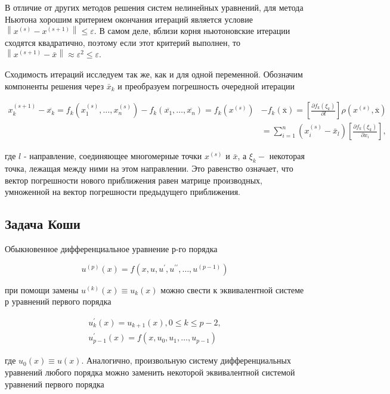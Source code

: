 \documentclass[a4paper,12pt]{article}
\begin{document}
В отличие от других методов решения систем нелинейных уравнений, для метода Ньютона хорошим критерием окончания итераций является условие $\left\|x^{(s)}-x^{(s+1)}\right\| \leq \varepsilon .$ В самом деле, вблизи корня ньютоновские итерации сходятся квадратично, поэтому если этот критерий выполнен, то $\left\|x^{(s+1)}-\bar{x}\right\| \approx \varepsilon^{2} \leq \varepsilon$.

Сходимость итераций исследуем так же, как и для одной переменной. Обозначим компоненты решения через $\bar{x}_{k}$ и преобразуем погрешность очередной итерации 

$$
\begin{aligned}
	x_{k}^{(s+1)}-\overline{x_{k}}=f_{k}\left(x_{1}^{(s)}, \ldots, x_{n}^{(s)}\right)-f_{k}\left(\overline{x_{1}}, \ldots, \overline{x_{n}}\right)=f_{k}\left(x^{(s)}\right)&-f_{k}(\overline{\mathrm{x}}) =\left[\frac{\partial f_{k}\left(\xi_{k}\right)}{\partial l}\right] \rho\left(x^{(s)}, \overline{\mathrm{x}}\right) \\
	&=\sum_{i=1}^{n}\left(x_{i}^{(s)}-\bar{x}_{l}\right)\left[\frac{\partial f_{k}\left(\xi_{k}\right)}{\partial x_{i}}\right],
\end{aligned}
$$

где $l$ - направление, соединяющее многомерные точки $x^{(s)}$ и $\bar{x}$, а $\xi_{k}-$ некоторая точка, лежащая между ними на этом направлении. Это равенство означает, что вектор погрешности нового приближения равен матрице производных, умноженной на вектор погрешности предыдущего приближения.

\subsection{Задача Коши}

Обыкновенное дифференциальное уравнение р-го порядка

$$
u^{(p)}(x)=f\left(x, u, u^{\prime}, u^{\prime \prime}, \ldots, u^{(p-1)}\right)
$$

при помощи замены $u^{(k)}(x) \equiv u_{k}(x)$ можно свести к эквивалентной системе р уравнений первого порядка

$$
\begin{gathered}
	u_{k}^{\prime}(x)=u_{k+1}(x), 0 \leq k \leq p-2, \\
	u_{p-1}^{\prime}(x)=f\left(x, u_{0}, u_{1}, \ldots, u_{p-1}\right)
\end{gathered}
$$

где $u_{0}(x) \equiv u(x) .$ Аналогично, произвольную систему дифференциальных уравнений любого порядка можно заменить некоторой эквивалентной системой уравнений первого порядка
\end{document}
